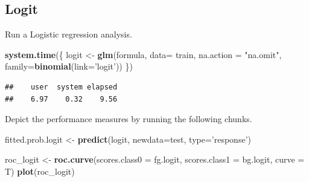 \documentclass[]{article}
\newenvironment{Shaded}{\begin{snugshade}}{\end{snugshade}}
\newcommand{\DataTypeTok}[1]{\textcolor[rgb]{0.13,0.29,0.53}{#1}}
\newcommand{\DecValTok}[1]{\textcolor[rgb]{0.00,0.00,0.81}{#1}}
\newcommand{\KeywordTok}[1]{\textcolor[rgb]{0.13,0.29,0.53}{\textbf{#1}}}
\newcommand{\NormalTok}[1]{#1}
\newcommand{\OperatorTok}[1]{\textcolor[rgb]{0.81,0.36,0.00}{\textbf{#1}}}
\newcommand{\StringTok}[1]{\textcolor[rgb]{0.31,0.60,0.02}{#1}}
\begin{document}
\hypertarget{logit}{%
\subsection{Logit}\label{logit}}

Run a Logistic regression analysis.

\begin{Shaded}
\begin{Highlighting}[]
\KeywordTok{system.time}\NormalTok{(\{}
\NormalTok{logit <-}\StringTok{ }\KeywordTok{glm}\NormalTok{(formula, }\DataTypeTok{data=}\NormalTok{ train,  }\DataTypeTok{na.action =} \StringTok{"na.omit"}\NormalTok{,}
             \DataTypeTok{family=}\KeywordTok{binomial}\NormalTok{(}\DataTypeTok{link=}\StringTok{'logit'}\NormalTok{))}
\NormalTok{\})}
\end{Highlighting}
\end{Shaded}

\begin{verbatim}
##    user  system elapsed 
##    6.97    0.32    9.56
\end{verbatim}

Depict the performance measures by running the following chunks.

\begin{Shaded}
\begin{Highlighting}[]
\NormalTok{fitted.prob.logit <-}\StringTok{ }\KeywordTok{predict}\NormalTok{(logit, }\DataTypeTok{newdata=}\NormalTok{test, }\DataTypeTok{type=}\StringTok{'response'}\NormalTok{)}
\end{Highlighting}
\end{Shaded}

\begin{Shaded}
\end{Shaded}

\begin{Shaded}
\begin{Highlighting}[]
\NormalTok{roc_logit <-}\StringTok{ }\KeywordTok{roc.curve}\NormalTok{(}\DataTypeTok{scores.class0 =}\NormalTok{ fg.logit,}
                       \DataTypeTok{scores.class1 =}\NormalTok{ bg.logit,}
                       \DataTypeTok{curve =}\NormalTok{ T)}
\KeywordTok{plot}\NormalTok{(roc_logit)}
\end{Highlighting}
\end{Shaded}
\end{document}
